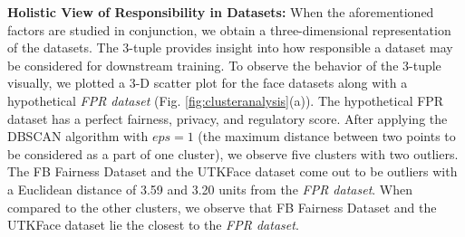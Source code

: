 \documentclass[journal]{IEEEtran}
\begin{document}
\noindent \textbf{Holistic View of Responsibility in Datasets:} When the aforementioned factors are studied in conjunction, we obtain a three-dimensional representation of the datasets. The 3-tuple provides insight into how responsible a dataset may be considered for downstream training. To observe the behavior of the 3-tuple visually, we plotted a 3-D scatter plot for the face datasets along with a hypothetical \textit{FPR dataset} (Fig. \ref{fig:clusteranalysis}(a)). The hypothetical FPR dataset has a perfect fairness, privacy, and regulatory score. After applying the DBSCAN algorithm with $eps=1$ (the maximum distance between two points to be considered as a part of one cluster), we observe five clusters with two outliers. The FB Fairness Dataset and the UTKFace dataset come out to be outliers with a Euclidean distance of 3.59 and 3.20 units from the \textit{FPR dataset}. 
When compared to the other clusters, we observe that FB Fairness Dataset and the UTKFace dataset lie the closest to the \textit{FPR dataset}.
\end{document}
